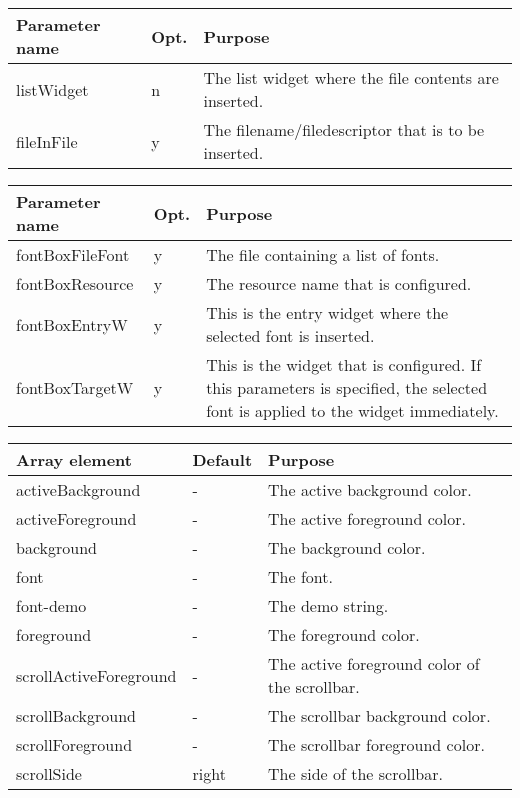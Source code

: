 {\newpage
\clearpage
\samepage \begin{tabular}{|l|l|p{6.5cm}|} \hline
Parameter name & Opt. & Purpose \\  \hline
listWidget     & n    & The list widget where the file
                        contents are inserted. \\  \hline
fileInFile     & y    & The filename/filedescriptor that is
                        to be inserted. \\  \hline
\end{tabular}
}

{\newpage
\clearpage
\samepage \begin{tabular}{|l|l|p{6.7cm}|} \hline
Parameter name  & Opt. & Purpose\\  \hline
fontBoxFileFont & y    & The file containing a list of
                         fonts.\\  \hline
fontBoxResource & y    & The resource name that is
                         configured.\\  \hline
fontBoxEntryW   & y    & This is the entry widget where the
                         selected font is inserted.\\  \hline
fontBoxTargetW  & y    & This is the widget that is
                         configured. If this parameters is
                         specified, the selected font is
                         applied to the widget
                         immediately.\\  \hline
\end{tabular}
}

{\newpage
\clearpage
\samepage \begin{tabular}{|l|l|p{5.5cm}|} \hline
Array element          & Default & Purpose\\  \hline
activeBackground       & -       & The active background
                                   color.\\  \hline
activeForeground       & -       & The active foreground
                                   color.\\  \hline
background             & -       & The background color.\\  \hline
font                   & -       & The font.\\  \hline
font-demo              & -       & The demo string.\\  \hline
foreground             & -       & The foreground color.\\  \hline
scrollActiveForeground & -       & The active foreground
                                   color of the scrollbar.\\  \hline
scrollBackground       & -       & The scrollbar background
                                   color.\\  \hline
scrollForeground       & -       & The scrollbar foreground
                                   color.\\  \hline
scrollSide             & right   & The side of the
                                   scrollbar.\\  \hline
\end{tabular}
}


